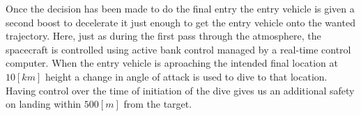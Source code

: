 Once the decision has been made to do the final entry the entry vehicle is given a second boost to decelerate it just enough to get the entry vehicle onto the wanted trajectory. Here, just as during the first pass through the atmosphere, the spacecraft is controlled using active bank control managed by a real-time control computer. When the entry vehicle is aproaching the intended final location at $10 \left[km\right]$ height a change in angle of attack is used to dive to that location. Having control over the time of initiation of the dive gives us an additional safety on landing within  $500 \left[m\right]$ from the target.